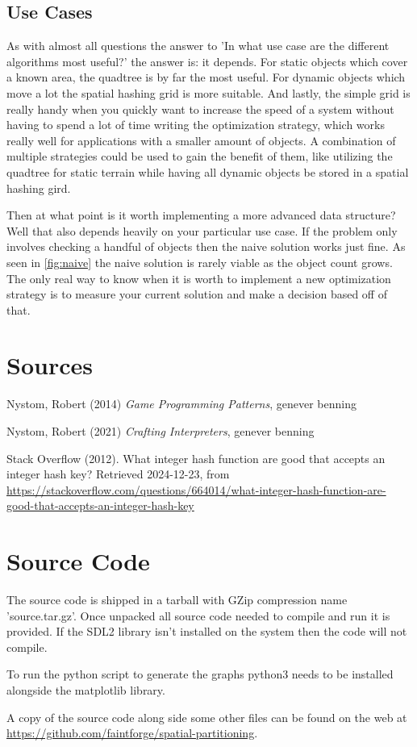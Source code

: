 \documentclass[a4paper, 12pt]{article}
\begin{document}
\subsection{Use Cases}
As with almost all questions the answer to 'In what use case are the different
algorithms most useful?' the answer is: it depends. For static objects which
cover a known area, the quadtree is by far the most useful. For dynamic objects
which move a lot the spatial hashing grid is more suitable. And lastly, the
simple grid is really handy when you quickly want to increase the speed of a
system without having to spend a lot of time writing the optimization strategy,
which works really well for applications with a smaller amount of objects. A
combination of multiple strategies could be used to gain the benefit of them,
like utilizing the quadtree for static terrain while having all dynamic objects
be stored in a spatial hashing gird.

Then at what point is it worth implementing a more advanced data structure? Well
that also depends heavily on your particular use case. If the problem only
involves checking a handful of objects then the naive solution works just fine.
As seen in \ref{fig:naive} the naive solution is rarely viable as the object
count grows. The only real way to know when it is worth to implement a new
optimization strategy is to measure your current solution and make a decision
based off of that.

\section{Sources}
Nystom, Robert (2014) \textit{Game Programming Patterns}, genever benning

Nystom, Robert (2021) \textit{Crafting Interpreters}, genever benning

Stack Overflow (2012). What integer hash function are good that accepts an
integer hash key? Retrieved 2024-12-23, from
\url{https://stackoverflow.com/questions/664014/what-integer-hash-function-are-good-that-accepts-an-integer-hash-key}

\appendix

\section{Source Code}
The source code is shipped in a tarball with GZip compression name
'source.tar.gz'. Once unpacked all source code needed to compile and run it is
provided. If the SDL2 library isn't installed on the system then the code will
not compile.

To run the python script to generate the graphs python3 needs to be installed
alongside the matplotlib library.

A copy of the source code along side some other files can be found on the web
at \url{https://github.com/faintforge/spatial-partitioning}.
\end{document}
